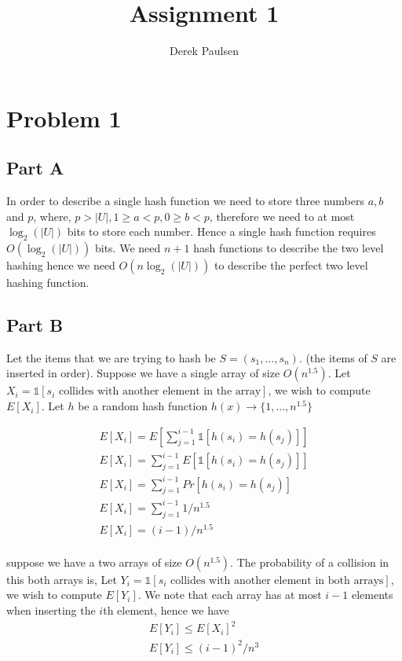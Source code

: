 \documentclass[a4paper]{article}
\title{Assignment 1} %
\author{
Derek Paulsen \\
}
\date{}
\newcommand{\ind}[1]{\mathds{1}[#1]}
\begin{document}
\maketitle 

\section{Problem 1}
\subsection{Part A}
In order to describe a single hash function we need to store three numbers $a,b$ and $p$, where,
$p > |U|, 1 \geq a < p, 0 \geq b < p$, therefore we need to at most $\log_2(|U|)$ bits to store 
each number. Hence a single hash function requires $O(\log_2(|U|))$ bits. We need $n+1$ hash functions 
to describe the two level hashing hence we need $O(n \log_2(|U|))$ to describe the perfect two level 
hashing function.


\subsection{Part B}
Let the items that we are trying to hash be $S = (s_1,...,s_n)$. (the items of $S$ are inserted in order).
Suppose we have a single array of size $O(n^{1.5})$. 
Let $X_i = \ind{s_i \text{  collides with another element in the array}}$, we wish to compute $E[X_i]$.
Let $h$ be a random hash function $h(x) \rightarrow \{1,...,n^{1.5}\}$

\begin{align*}
	E[X_i] = E[\sum_{j=1}^{i-1} \ind{h(s_i) = h(s_j)}]\\
	E[X_i] = \sum_{j=1}^{i-1} E[\ind{h(s_i) = h(s_j)}]\\
	E[X_i] = \sum_{j=1}^{i-1} Pr[h(s_i) = h(s_j)]\\
	E[X_i] = \sum_{j=1}^{i-1} 1/n^{1.5}\\
	E[X_i] =  (i-1)/n^{1.5}\\
\end{align*}

suppose we have a two arrays of size $O(n^{1.5})$. The probability of a collision in this both arrays is,
Let $Y_i = \ind{s_i \text{  collides with another element in both arrays}}$, we wish to compute $E[Y_i]$.
We note that each array has at most $i-1$ elements when inserting the $i$th element, hence we have 
\begin{align*}
	E[Y_i] \leq E[X_i]^2\\
	E[Y_i] \leq (i-1)^2/n^{3}\\
\end{align*}
\end{document}
